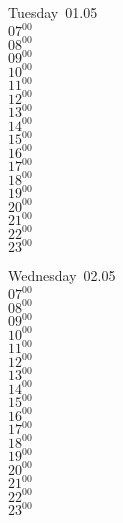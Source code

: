 \documentclass[11pt, a4paper]{book}\usepackage[]{graphicx}\usepackage[]{color}
\begin{document}
\begin{weekdaybox}
  Tuesday~01.05\\
  { 
  \vfill
  $07^{00}$\\
$08^{00}$\\
$09^{00}$\\
$10^{00}$\\
$11^{00}$\\
$12^{00}$\\
$13^{00}$\\
$14^{00}$\\
$15^{00}$\\
$16^{00}$\\
$17^{00}$\\
$18^{00}$\\
$19^{00}$\\
$20^{00}$\\
$21^{00}$\\
$22^{00}$\\
$23^{00}$\\
  }
\end{weekdaybox}
\begin{weekdaybox}
  Wednesday~02.05\\
  { 
  \vfill
  $07^{00}$\\
$08^{00}$\\
$09^{00}$\\
$10^{00}$\\
$11^{00}$\\
$12^{00}$\\
$13^{00}$\\
$14^{00}$\\
$15^{00}$\\
$16^{00}$\\
$17^{00}$\\
$18^{00}$\\
$19^{00}$\\
$20^{00}$\\
$21^{00}$\\
$22^{00}$\\
$23^{00}$\\
  }
\end{weekdaybox}
\clearpage
\begin{headerbox}
\end{headerbox}
\end{document}

